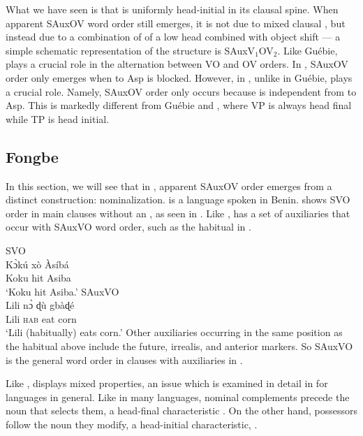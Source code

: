 \documentclass[output=paper,newtxmath,modfonts,nonflat,draftmode]{langsci/langscibook}
\begin{document}
What we have seen is that  is uniformly head-initial in its clausal spine. When apparent SAuxOV word order still emerges, it is not due to mixed clausal , but instead due to a combination of  of a low  head combined with object shift --- a simple schematic representation of the structure is SAuxV$_1$OV$_2$. Like Guébie,  plays a crucial role in the alternation between VO and OV orders. In , SAuxOV order only emerges when  to Asp is blocked. However, in , unlike in Guébie,  plays a crucial role. Namely, SAuxOV order only occurs because  is independent from  to Asp. This is markedly different from Guébie and , where VP is always head final while TP is head initial.

\subsection{Fongbe}

 In this section, we will see that in , apparent SAuxOV order emerges from a distinct construction: nominalization.   is a  language spoken in Benin.  shows SVO order in main clauses without an , as seen in . Like ,  has a set of auxiliaries that occur with SAuxVO word order, such as the habitual in .%

\ea \label{ex:Fongbe-SVO}  
{SVO}\\
\ea 
\gll K{{\`ɔ}kú} xò Àsíbá \\
Koku hit Asiba \\
\glt `Koku hit Asiba.' \hfill \citep[][247]{lefebvre2002}
\ex \label{ex:Fongbe-SAuxVO}
 {SAuxVO}\\
\gll Lili {n{\`ɔ}} {ɖù} {gbàɖé}  \\
Lili \textsc{hab} eat corn \\
\glt `Lili (habitually) eats corn.' \hfill \citep[][94]{lefebvre2002}
\z
\z 
Other auxiliaries occurring in the same position as the habitual above include the future, irrealis, and anterior markers. So SAuxVO is the general word order in clauses with auxiliaries in .

Like ,  displays mixed  properties, an issue which is examined in detail in \citet{aboh04} for  languages in general. Like in many  languages,  nominal complements precede the noun that selects them, a head-final characteristic . On the other hand, possessors follow the noun they modify, a head-initial characteristic, .
\end{document}
